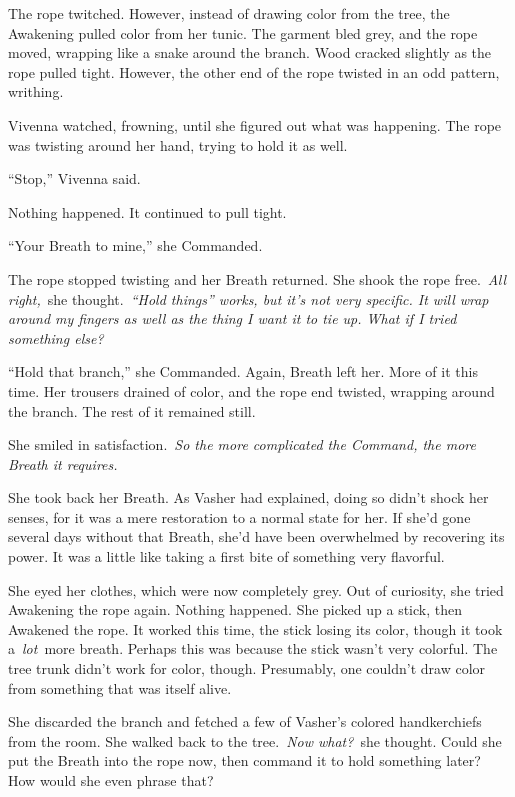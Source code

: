 The rope twitched. However, instead of drawing color from the tree, the Awakening pulled color from her tunic. The garment bled grey, and the rope moved, wrapping like a snake around the branch. Wood cracked slightly as the rope pulled tight. However, the other end of the rope twisted in an odd pattern, writhing.

Vivenna watched, frowning, until she figured out what was happening. The rope was twisting around her hand, trying to hold it as well.

“Stop,” Vivenna said.

Nothing happened. It continued to pull tight.

“Your Breath to mine,” she Commanded.

The rope stopped twisting and her Breath returned. She shook the rope free.~\textit{All right,}~she thought.~\textit{“Hold things” works, but it’s not very specific. It will wrap around my fingers as well as the thing I want it to tie up. What if I tried something else?}

“Hold that branch,” she Commanded. Again, Breath left her. More of it this time. Her trousers drained of color, and the rope end twisted, wrapping around the branch. The rest of it remained still.

She smiled in satisfaction.~\textit{So the more complicated the Command, the more Breath it requires.}

She took back her Breath. As Vasher had explained, doing so didn’t shock her senses, for it was a mere restoration to a normal state for her. If she’d gone several days without that Breath, she’d have been overwhelmed by recovering its power. It was a little like taking a first bite of something very flavorful.

She eyed her clothes, which were now completely grey. Out of curiosity, she tried Awakening the rope again. Nothing happened. She picked up a stick, then Awakened the rope. It worked this time, the stick losing its color, though it took a~\textit{lot}~more breath. Perhaps this was because the stick wasn’t very colorful. The tree trunk didn’t work for color, though. Presumably, one couldn’t draw color from something that was itself alive.

She discarded the branch and fetched a few of Vasher’s colored handkerchiefs from the room. She walked back to the tree.~\textit{Now what?}~she thought. Could she put the Breath into the rope now, then command it to hold something later? How would she even phrase that?

